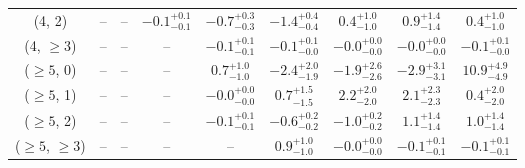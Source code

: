 \begin{table}[h!]
{\begin{tabular}{ccccccccc}
	(4, 2) & -- & -- & $-0.1^{+ 0.1 }_{- 0.1 }$ & $-0.7^{+ 0.3 }_{- 0.3 }$ & $-1.4^{+ 0.4 }_{- 0.4 }$ & $0.4^{+ 1.0 }_{- 1.0 }$ & $0.9^{+ 1.4 }_{- 1.4 }$ & $0.4^{+ 1.0 }_{- 1.0 }$ \\[0.5ex] 
	(4, $\ge3$) & -- & -- & -- & $-0.1^{+ 0.1 }_{- 0.1 }$ & $-0.1^{+ 0.1 }_{- 0.0 }$ & $-0.0^{+ 0.0 }_{- 0.0 }$ & $-0.0^{+ 0.0 }_{- 0.0 }$ & $-0.1^{+ 0.1 }_{- 0.0 }$ \\[0.5ex] 
	($\ge5$, 0) & -- & -- & -- & $0.7^{+ 1.0 }_{- 1.0 }$ & $-2.4^{+ 2.0 }_{- 1.9 }$ & $-1.9^{+ 2.6 }_{- 2.6 }$ & $-2.9^{+ 3.1 }_{- 3.1 }$ & $10.9^{+ 4.9 }_{- 4.9 }$ \\[0.5ex] 
	($\ge5$, 1) & -- & -- & -- & $-0.0^{+ 0.0 }_{- 0.0 }$ & $0.7^{+ 1.5 }_{- 1.5 }$ & $2.2^{+ 2.0 }_{- 2.0 }$ & $2.1^{+ 2.3 }_{- 2.3 }$ & $0.4^{+ 2.0 }_{- 2.0 }$ \\[0.5ex] 
	($\ge5$, 2) & -- & -- & -- & $-0.1^{+ 0.1 }_{- 0.1 }$ & $-0.6^{+ 0.2 }_{- 0.2 }$ & $-1.0^{+ 0.2 }_{- 0.2 }$ & $1.1^{+ 1.4 }_{- 1.4 }$ & $1.0^{+ 1.4 }_{- 1.4 }$ \\[0.5ex] 
	($\ge5$, $\ge3$) & -- & -- & -- & -- & $0.9^{+ 1.0 }_{- 1.0 }$ & $-0.0^{+ 0.0 }_{- 0.0 }$ & $-0.1^{+ 0.1 }_{- 0.1 }$ & $-0.1^{+ 0.1 }_{- 0.1 }$ \\[0.5ex] 
	\hline
	\hline
\end{tabular}}
\end{table}

